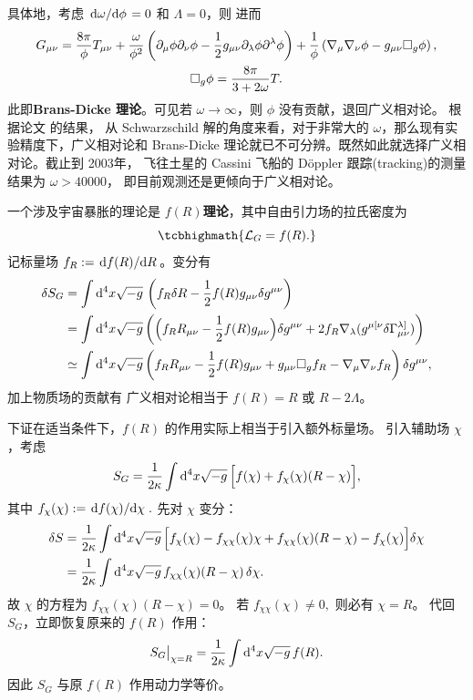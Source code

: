 具体地，考虑 $\dv*{\omega}{\phi}=0$ 和 $\Lambda=0$，则
进而
\begin{gather}
    G_{\mu \nu}=\frac{8 \pi}{\phi} T_{\mu \nu}+\frac{\omega}{\phi^2}\left(\partial_\mu \phi \partial_\nu \phi-\frac{1}{2} g_{\mu \nu} \partial_\lambda \phi \partial^\lambda \phi\right)+\frac{1}{\phi}\left(\nabla_\mu \nabla_\nu \phi-g_{\mu \nu} \square_g \phi\right), \\
    \square_g\phi=\frac{8 \pi}{3+2 \omega} T.
\end{gather}
此即\textbf{Brans-Dicke 理论}。可见若 $\omega\to\infty$，则 $\phi$ 没有贡献，退回广义相对论。
根据论文 \cite{Bhabra} 的结果，
从 Schwarzschild 解的角度来看，对于非常大的 $\omega$，那么现有实验精度下，广义相对论和 Brans-Dicke 理论就已不可分辨。既然如此就选择广义相对论。截止到 2003年，
飞往土星的 Cassini 飞船的 D\"oppler 跟踪(tracking)\cite{Will-thesis}的测量结果为 $\omega>40000$，
即目前观测还是更倾向于广义相对论。


一个涉及宇宙暴胀的理论是 $f(R)$\textbf{理论}，其中自由引力场的拉氏密度为
\[\tcbhighmath{\Lag_G=f(R).}\]
记标量场 $f_R:=\dv*{f(R)}{R}$。变分有
\begin{align*}
\delta S_G &= \int\dd[4]x\sqrt{-g}\, \left(f_R \delta R -\frac12 f(R) g_{\mu\nu}\delta g^{\mu\nu}\right)\\
&=  \int\dd[4]x\sqrt{-g}\, \bigg(\Big(f_R R_{\mu \nu} -\frac{1}{2} f(R) g_{\mu \nu} \Big) \delta g^{\mu \nu}+2 f_R \nabla_\lambda(g^{\mu [\nu} \delta \Gamma_{\mu \nu}^{\lambda]})\bigg) \\
&\simeq \int\dd[4]x\sqrt{-g} \left(f_R R_{\mu \nu} -\frac{1}{2} f(R) g_{\mu \nu} +g_{\mu\nu} \square_g f_R - \nabla_\mu\nabla_\nu f_R\right) \delta g^{\mu\nu},
\end{align*}
加上物质场的贡献有
广义相对论相当于 $f(R)=R$ 或 $R-2\Lambda$。

下证在适当条件下，$f(R)$ 的作用实际上相当于引入额外标量场。
引入辅助场 $\chi$，考虑
\[
S_G
=
\frac1{2\kappa}\int \dd[4]x\sqrt{-g}\,
\Bigl[f(\chi)+f_\chi(\chi)(R-\chi)\Bigr]
,
\]
其中 $f_\chi(\chi):=\dv*{f(\chi)}{\chi}.$
先对 $\chi$ 变分：
\begin{align*}
    \delta S
&=
\frac1{2\kappa}\int \dd[4]x\sqrt{-g}\,
\Bigl[f_\chi(\chi)-f_{\chi\chi}(\chi)\chi+f_{\chi\chi}(\chi)(R-\chi)-f_\chi(\chi)\Bigr]\delta\chi\\
&=\frac1{2\kappa}\int \dd[4]x\sqrt{-g}\,
f_{\chi\chi}(\chi)(R-\chi)\,\delta\chi.
\end{align*}
故 $\chi$ 的方程为 $f_{\chi\chi}(\chi)(R-\chi)=0$。
若 $f_{\chi\chi}(\chi)\neq 0,$
则必有 $\chi=R$。
代回 $S_G$，立即恢复原来的 $f(R)$ 作用：
\[
S_G\big|_{\chi=R}
=
\frac1{2\kappa}\int \dd[4]x\sqrt{-g}\,f(R).
\]
因此 $S_G$ 与原 $f(R)$ 作用动力学等价。


